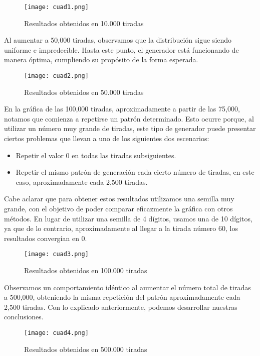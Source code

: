 \documentclass{article}
\begin{document}
\begin{figure}[H]
    \centering
    \texttt{[image: cuad1.png]}
    \caption{Resultados obtenidos en 10.000 tiradas}
    \label{fig:cuad-10000}
\end{figure}

Al aumentar a 50,000 tiradas, observamos que la distribución sigue siendo uniforme e impredecible. Hasta este punto, el generador está funcionando de manera óptima, cumpliendo su propósito de la forma esperada.

\begin{figure}[H]
    \centering
    \texttt{[image: cuad2.png]}
    \caption{Resultados obtenidos en 50.000 tiradas}
    \label{fig:cuad-50000}
\end{figure}

En la gráfica de las 100,000 tiradas, aproximadamente a partir de las 75,000, notamos que comienza a repetirse un patrón determinado. Esto ocurre porque, al utilizar un número muy grande de tiradas, este tipo de generador puede presentar ciertos problemas que llevan a uno de los siguientes dos escenarios:
\begin{itemize}
    \item Repetir el valor 0 en todas las tiradas subsiguientes.
    \item Repetir el mismo patrón de generación cada cierto número de tiradas, en este caso, aproximadamente cada 2,500 tiradas.
\end{itemize}
Cabe aclarar que para obtener estos resultados utilizamos una semilla muy grande, con el objetivo de poder comparar eficazmente la gráfica con otros métodos. En lugar de utilizar una semilla de 4 dígitos, usamos una de 10 dígitos, ya que de lo contrario, aproximadamente al llegar a la tirada número 60, los resultados convergían en 0.

\begin{figure}[H]
    \centering
    \texttt{[image: cuad3.png]}
    \caption{Resultados obtenidos en 100.000 tiradas}
    \label{fig:cuad-100000}
\end{figure}

Observamos un comportamiento idéntico al aumentar el número total de tiradas a 500,000, obteniendo la misma repetición del patrón aproximadamente cada 2,500 tiradas. Con lo explicado anteriormente, podemos desarrollar nuestras conclusiones.

\begin{figure}[H]
    \centering
    \texttt{[image: cuad4.png]}
    \caption{Resultados obtenidos en 500.000 tiradas}
    \label{fig:cuad-500000}
\end{figure}
\end{document}
